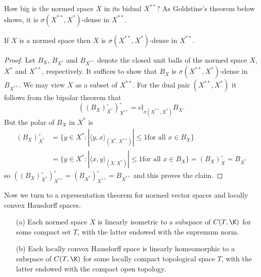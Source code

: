 How big is the normed space $X$ in its bidual $X^{**}$? As Goldstine's theorem below shows, it is $\sigma(X^{**},X^*)$-dense in $X^{**}$.
\begin{theorem}\label{NVS weak topo dense in bidual}
If $X$ is a normed space then $X$ is $\sigma(X^{**},X^*)$-dense in $X^{**}$.
\end{theorem}
\begin{proof}
Let $B_X$, $B_{X^*}$ and $B_{X^{**}}$ denote the closed unit balls of the normed space $X$, $X^*$ and $X^{**}$, respectively. It suffices to show that $B_X$ is $\sigma(X^{**},X^*)$-dense in $B_{X^{**}}$. We may view $X$ as a subset of $X^{**}$. For the dual pair $(X^{**},X^*)$ it follows from the bipolar theorem that
\[((B_X)^{\circ}_{X^*})^{\circ}_{X^{**}}=\mathrm{cl}_{\sigma(X^{**},X^*)}B_X.\]
But the polar of $B_X$ in $X^*$ is
\begin{equation*}
\begin{aligned}
(B_X)^{\circ}_{X^*}&=\{y\in X^*:|\langle y,x\rangle_{(X^*,X^{**})}|\leq 1\text{for all $x\in B_X$}\}\\
&=\{y\in X^*:|\langle x,y\rangle_{(X,X^*)}|\leq 1\text{for all $x\in B_X$}\}=(B_X)^{\circ}_{X}=B_{X^*}
\end{aligned}
\end{equation*}
so $((B_X)^{\circ}_{X^*})^{\circ}_{X^{**}}=(B_{X^*})^\circ_{X^{**}}=B_{X^{**}}$ and this proves the claim.
\end{proof}
Now we turn to a representation theorem for normed vector spaces and locally convex Hausdorff spaces.
\begin{proposition}\label{LCHS NVS representation}
\mbox{}
\begin{itemize}
\item[(a)] Each normed space $X$ is linearly isometric to a subspace of $C(T,\K)$ for some compact set $T$, with the latter endowed with the supremum norm.
\item[(b)] Each locally convex Hausdorff space is linearly homeomorphic to a subspace of $C(T,\K)$ for some locally compact topological space $T$, with the latter endowed with the compact open topology.
\end{itemize}
\end{proposition}
